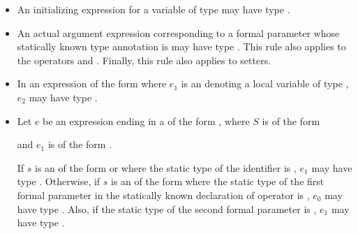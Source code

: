 \documentclass[makeidx]{article}
\begin{document}
{\begin{itemize}
{    in a number of situations
    (\ref{functions}).%
  }
\item
  An initializing expression for a variable of type \VOID{}
  may have type \VOID.
\item
  An actual argument expression corresponding to a formal parameter
  whose statically known type annotation is \VOID{}
  may have type \VOID.
  This rule also applies to the operators \code{[]} and \code{[]=}.
  Finally, this rule also applies to setters.
\item
  In an expression of the form 
  where $e_1$ is an  denoting a local variable
  of type \VOID,
  $e_2$ may have type \VOID.
\item
  Let $e$ be an expression ending in a 
  of the form ,
  where $S$ is of the form

  \noindent

  \noindent
  and $e_1$ is of the form .

  If $s$ is an  of the
  form  or 
  where the static type of the identifier \id{} is \VOID,
  $e_1$ may have type \VOID.
  Otherwise, if $s$ is an  of the form
  \code{[$\,e_0\,$]} where the static type of
  the first formal parameter in the statically known declaration
  of operator \code{[]=} is \VOID,
  $e_0$ may have type \VOID.
  Also, if the static type of the second formal parameter is \VOID,
  $e_1$ may have type \VOID.
\end{itemize}

}
\end{document}
